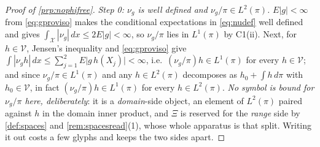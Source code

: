 \begin{proof}[Proof of \cref{prp:nophifree}]
\emph{Step 0: $\nu_g$ is well defined and $\nu_g/\pi\in L^{2}(\pi)$.}
$E|g|<\infty$ from \eqref{eq:gproviso} makes the conditional expectations in \eqref{eq:nudef} well
defined and gives $\int_{\mathcal X}|\nu_g|\,dx\le2E|g|<\infty$, so $\nu_g/\pi$ lies in
$L^{1}(\pi)$ by C1(ii). Next, for $h\in\mathcal V$, Jensen's inequality and \eqref{eq:gproviso} give
$\int|\nu_g h|\,dx\le\sum_{j=1}^{2}E\big|g\,h(X_j)\big|<\infty$, i.e.\ $(\nu_g/\pi)h\in L^{1}(\pi)$ for every
$h\in\mathcal V$; and since $\nu_g/\pi\in L^{1}(\pi)$ and any $h\in L^{2}(\pi)$ decomposes as $h_0+\int h\,d\pi$
with $h_0\in\mathcal V$, in fact $(\nu_g/\pi)h\in L^{1}(\pi)$ for every $h\in L^{2}(\pi)$.
\emph{No symbol is bound for $\nu_g/\pi$ here, deliberately}: it is a \emph{domain}-side object, an
element of $L^{2}(\pi)$ paired against $h$ in the domain inner product, and $\Xi$ is reserved for the
\emph{range} side by \cref{def:spaces} and \cref{rem:spacesread}\textup{(1)}, whose whole apparatus is
that split. Writing it out costs a few glyphs and keeps the two sides apart.

\end{proof}
